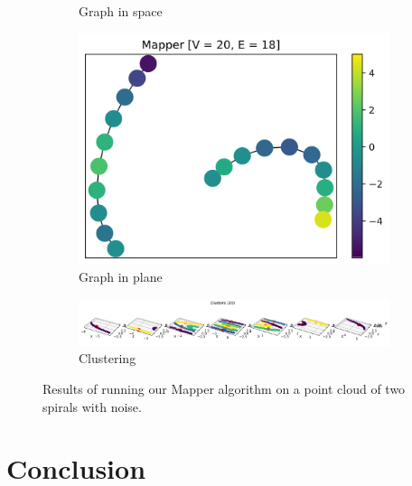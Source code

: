 \documentclass{article}
\begin{document}
\begin{figure}[ht]
\begin{subfigure}[c]{0.3\columnwidth}
        \caption{Graph in space}
        \label{fig:spirals-space}
    \end{subfigure}
    \begin{subfigure}[c]{0.3\columnwidth}
        \centering
        \includegraphics[width=\textwidth]{spirals-graph-2d}
        \caption{Graph in plane}
        \label{fig:spirals-plane}
    \end{subfigure}
    \begin{subfigure}[c]{0.9\columnwidth}
        \centering
        \includegraphics[width=\textwidth]{spirals-clusters}
        \caption{Clustering}
        \label{fig:spirals-cluster}
    \end{subfigure}
    \caption{Results of running our Mapper algorithm on a point cloud of two spirals with noise.}
    \label{fig:spirals}
\end{figure}

\section{Conclusion}\label{sec:concl}



\end{document}
